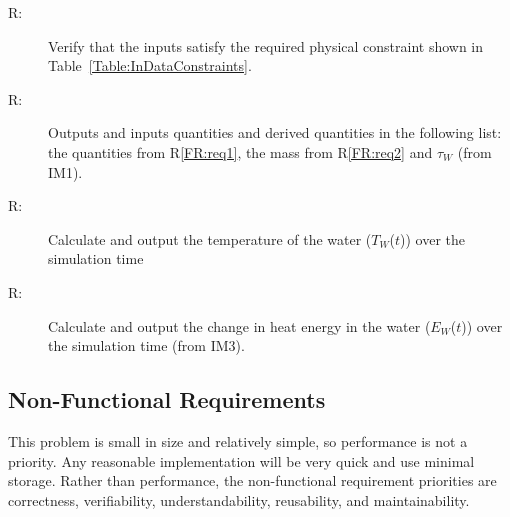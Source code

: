 \documentclass[12pt]{article}
\newcounter{reqnum}
\newcommand{\rthereqnum}{R\thereqnum}
\begin{document}
\begin{description}
\item[\rthereqnum\label{FR:req3}:]Verify that the inputs satisfy the required physical constraint shown in Table~\ref{Table:InDataConstraints}.
\end{description}
\begin{description}
\item[\rthereqnum\label{FR:req4}:]Outputs and inputs quantities and derived quantities in the following list: the quantities from R\ref{FR:req1}, the mass from R\ref{FR:req2} and ${\tau{}_{W}}$ (from IM1).
\end{description}
\begin{description}
\item[\rthereqnum\label{FR:req5}:]Calculate and output the temperature of the water (${T_{W}}$($t$)) over the simulation time
\end{description}
\begin{description}
\item[\rthereqnum\label{FR:req6}:]Calculate and output the change in heat energy in the water (${E_{W}}$($t$)) over the simulation time (from IM3).
\end{description}
\subsection{Non-Functional Requirements}
\label{Sec:NFRs}
This problem is small in size and relatively simple, so performance is not a priority. Any reasonable implementation will be very quick and use minimal storage. Rather than performance, the non-functional requirement priorities are correctness, verifiability, understandability, reusability, and maintainability.
\end{document}
